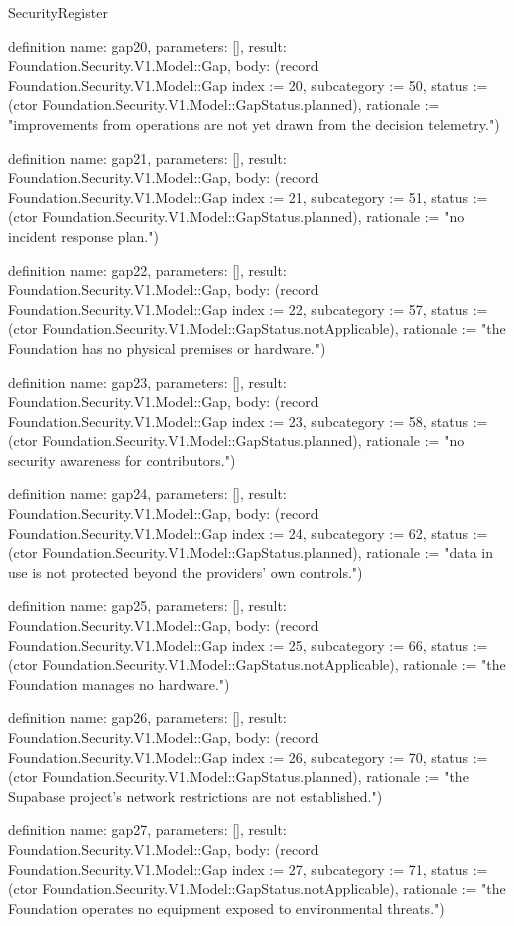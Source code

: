 \begin{lexlean}{SecurityRegister}
\begin{semanticmodule}
definition{
  name: gap20,
  parameters: [],
  result: Foundation.Security.V1.Model::Gap,
  body: (record Foundation.Security.V1.Model::Gap {index := 20, subcategory := 50, status := (ctor Foundation.Security.V1.Model::GapStatus.planned), rationale := "improvements from operations are not yet drawn from the decision telemetry."})
}

definition{
  name: gap21,
  parameters: [],
  result: Foundation.Security.V1.Model::Gap,
  body: (record Foundation.Security.V1.Model::Gap {index := 21, subcategory := 51, status := (ctor Foundation.Security.V1.Model::GapStatus.planned), rationale := "no incident response plan."})
}

definition{
  name: gap22,
  parameters: [],
  result: Foundation.Security.V1.Model::Gap,
  body: (record Foundation.Security.V1.Model::Gap {index := 22, subcategory := 57, status := (ctor Foundation.Security.V1.Model::GapStatus.notApplicable), rationale := "the Foundation has no physical premises or hardware."})
}

definition{
  name: gap23,
  parameters: [],
  result: Foundation.Security.V1.Model::Gap,
  body: (record Foundation.Security.V1.Model::Gap {index := 23, subcategory := 58, status := (ctor Foundation.Security.V1.Model::GapStatus.planned), rationale := "no security awareness for contributors."})
}

definition{
  name: gap24,
  parameters: [],
  result: Foundation.Security.V1.Model::Gap,
  body: (record Foundation.Security.V1.Model::Gap {index := 24, subcategory := 62, status := (ctor Foundation.Security.V1.Model::GapStatus.planned), rationale := "data in use is not protected beyond the providers' own controls."})
}

definition{
  name: gap25,
  parameters: [],
  result: Foundation.Security.V1.Model::Gap,
  body: (record Foundation.Security.V1.Model::Gap {index := 25, subcategory := 66, status := (ctor Foundation.Security.V1.Model::GapStatus.notApplicable), rationale := "the Foundation manages no hardware."})
}

definition{
  name: gap26,
  parameters: [],
  result: Foundation.Security.V1.Model::Gap,
  body: (record Foundation.Security.V1.Model::Gap {index := 26, subcategory := 70, status := (ctor Foundation.Security.V1.Model::GapStatus.planned), rationale := "the Supabase project's network restrictions are not established."})
}

definition{
  name: gap27,
  parameters: [],
  result: Foundation.Security.V1.Model::Gap,
  body: (record Foundation.Security.V1.Model::Gap {index := 27, subcategory := 71, status := (ctor Foundation.Security.V1.Model::GapStatus.notApplicable), rationale := "the Foundation operates no equipment exposed to environmental threats."})
}


\end{semanticmodule}
\end{lexlean}
